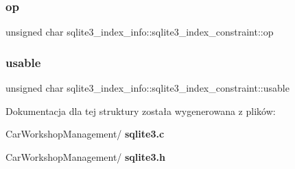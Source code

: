 \mbox{\label{structsqlite3__index__info_1_1sqlite3__index__constraint_a362f4ec1f71975cb0ac39a8b5e4b1476}} 
\subsubsection{op}
{\footnotesize\ttfamily unsigned char sqlite3\+\_\+index\+\_\+info\+::sqlite3\+\_\+index\+\_\+constraint\+::op}

\mbox{\label{structsqlite3__index__info_1_1sqlite3__index__constraint_ae16e62caeab743cc68bb22227dacb501}} 
\subsubsection{usable}
{\footnotesize\ttfamily unsigned char sqlite3\+\_\+index\+\_\+info\+::sqlite3\+\_\+index\+\_\+constraint\+::usable}



Dokumentacja dla tej struktury została wygenerowana z plików\+:\begin{DoxyCompactItemize}
\item 
Car\+Workshop\+Management/\textbf{ sqlite3.\+c}\item 
Car\+Workshop\+Management/\textbf{ sqlite3.\+h}\end{DoxyCompactItemize}
